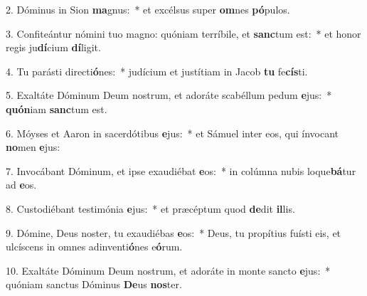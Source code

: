 2. Dóminus in Sion \textbf{ma}gnus:~*  et excélsus super \textbf{om}nes \textbf{pó}pulos.\

3. Confiteántur nómini tuo magno: quóniam terríbile, et \textbf{sanc}tum est:~*  et honor regis ju\textbf{dí}cium \textbf{dí}ligit.\

4. Tu parásti directi\textbf{ó}nes:~*  judícium et justítiam in Jacob \textbf{tu} fe\textbf{cís}ti.\

5. Exaltáte Dóminum Deum nostrum, et adoráte scabéllum pedum \textbf{e}jus:~*  \textbf{quón}iam \textbf{sanc}tum est.\

6. Móyses et Aaron in sacerdótibus \textbf{e}jus:~*  et Sámuel inter eos, qui ínvocant \textbf{no}men \textbf{e}jus:\

7. Invocábant Dóminum, et ipse exaudiébat \textbf{e}os:~*  in colúmna nubis loque\textbf{bá}tur ad \textbf{e}os.\

8. Custodiébant testimónia \textbf{e}jus:~*  et præcéptum quod \textbf{de}dit \textbf{il}lis.\

9. Dómine, Deus noster, tu exaudiébas \textbf{e}os:~*  Deus, tu propítius fuísti eis, et ulcíscens in omnes adinventi\textbf{ó}nes e\textbf{ó}rum.\

10. Exaltáte Dóminum Deum nostrum, et adoráte in monte sancto \textbf{e}jus:~*  quóniam sanctus Dóminus \textbf{De}us \textbf{nos}ter.\

